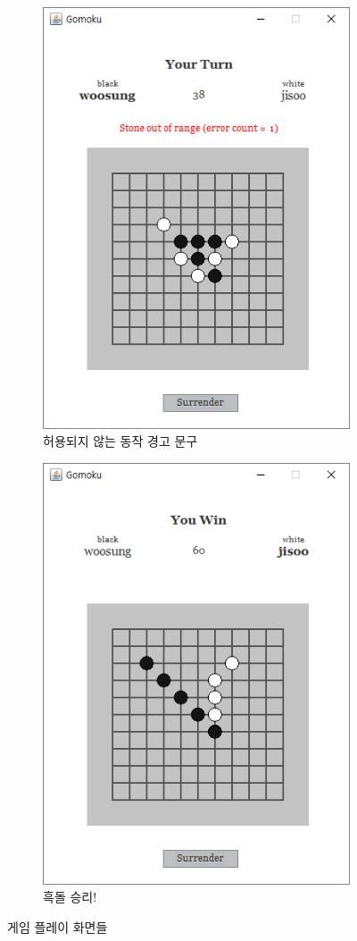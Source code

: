 \documentclass[a4paper, 10pt]{article}
\begin{document}
\begin{figure}[h]
\begin{subfigure}{.3\textwidth}
    \includegraphics[width=.8\linewidth]{resource/out_of_board}
    \caption{허용되지 않는 동작 경고 문구}
    \label{fig:room}
  \end{subfigure}
  \begin{subfigure}{.3\textwidth}
    \centering
    \includegraphics[width=.8\linewidth]{resource/win}
    \caption{흑돌 승리!}
    \label{fig:room}
  \end{subfigure}
  \caption{게임 플레이 화면들}
\end{figure}
\end{document}
